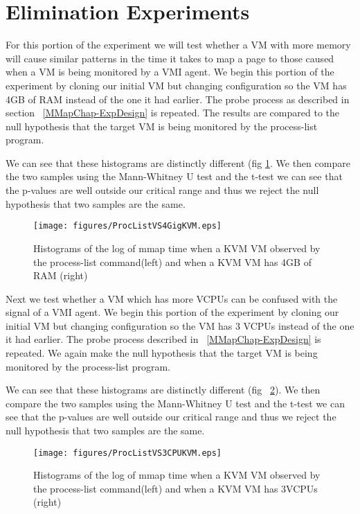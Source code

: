 \section{Elimination Experiments}

For this portion of the experiment we will test whether a VM with more memory will cause similar patterns in the time it takes to map a page  to those caused when a VM is being monitored by a VMI agent. We begin this portion of the experiment by cloning our initial VM but changing configuration so the VM has 4GB of RAM instead of the one it had earlier. The probe process as described in section ~\ref{MMapChap-ExpDesign} is repeated. The results are compared to the null hypothesis that the target VM is being monitored by the process-list program. 


We can see that these histograms are distinctly different (fig \ref{KVMMMapVS4Gig}. We then compare the two samples using the Mann-Whitney U test and the t-test we can see that the p-values are well outside our critical range and thus we reject the null hypothesis that two samples are the same. 

	\begin{figure}[p!]\label{KVMMMapVS4Gig}
	  \centering
	  \texttt{[image: figures/ProcListVS4GigKVM.eps]}
	  \caption{Histograms of the log of mmap time when a KVM VM observed by the process-list command(left) and when a KVM VM has 4GB of RAM (right)} 
	\end{figure}

Next we test whether a VM which has more VCPUs can be confused with the signal of a VMI agent. We begin this portion of the experiment by cloning our initial VM but changing configuration so the VM has 3 VCPUs  instead of the one it had earlier. The probe process described in ~\ref{MMapChap-ExpDesign} is repeated. We again make the null hypothesis that the target VM is being monitored by the process-list program. 

We can see that these histograms are distinctly different (fig ~\ref{KVMMMapVS43VCPU}). We then compare the two samples using the Mann-Whitney U test and the t-test we can see that the p-values are well outside our critical range and thus we reject the null hypothesis that two samples are the same.


	\begin{figure}[p!]\label{KVMMMapVS43VCPU}
	  \centering
	  \texttt{[image: figures/ProcListVS3CPUKVM.eps]}
	  \caption{Histograms of the log of mmap time when a KVM VM observed by the process-list command(left) and when a KVM VM has 3VCPUs (right)}
	\end{figure}


